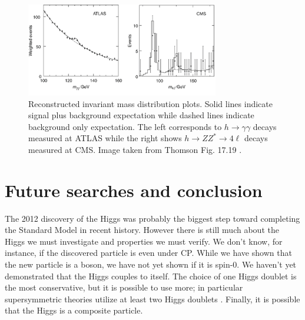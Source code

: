 \begin{figure}
  \centering
  \includegraphics[width=0.75\textwidth,height=0.75\textheight,keepaspectratio]
                {pictures/higgs_results.png}
  \caption{Reconstructed invariant mass distribution plots. Solid lines
           indicate signal plus background expectation while dashed lines
           indicate background only expectation. The left corresponds to 
           $h\to\gamma\gamma$ decays measured at ATLAS while the right shows
           $h\to ZZ^{*}\to4\ell$ decays measured at CMS. Image taken from 
           Thomson Fig. 17.19 \cite{thomson_modern_2013}.}
  \label{fig:higgsevidence}
\end{figure}

\section{Future searches and conclusion}
The 2012 discovery of the Higgs was probably the biggest step toward completing
the Standard Model in recent history. However there is still much about the
Higgs we must investigate and properties we must verify. We don't know, for
instance, if the discovered particle is even under CP. While we have shown
that the new particle is a boson, we have not yet shown if it is spin-0. We 
haven't yet demonstrated that the Higgs couples to itself. The choice of one 
Higgs doublet is the most conservative, but it is possible to use more; in 
particular supersymmetric theories utilize at least two Higgs doublets 
\cite{thomson_modern_2013}. Finally, it is possible that the 
Higgs is a composite particle. 



                               

